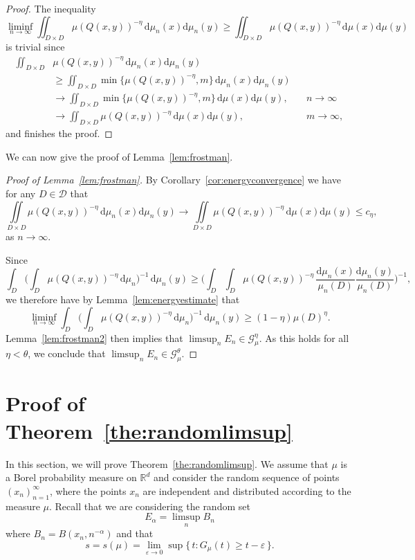 \documentclass[AHL,Unicode,longabstracts]{cedram}
\newcommand*{\dd}{\mathrm{d}}
\begin{document}
\begin{proof}
The inequality
\[
\liminf_{n\to \infty} \iint_{D \times D} \mu (Q (x,y))^{-\eta} \,
\dd \mu_n (x) \dd \mu_n (y) \geq \iint_{D \times D} \mu(Q (x,y))^{-\eta} \, \dd\mu (x) \dd \mu (y)
\]
is trivial since
\begin{align*}
\iint_{D \times D} & \mu (Q (x,y))^{-\eta} \, \dd \mu_n (x)
\dd \mu_n (y) \\ & \geq \iint_{D \times D} \min \{ \mu (Q (x,y))^{-\eta}, m \} \, \dd \mu_n (x) \dd \mu_n (y)
\\ &\to \iint_{D \times D} \min \{ \mu (Q (x,y))^{-\eta}, m \} \,
\dd \mu (x) \dd \mu (y), && n \to \infty \\ &\to
\iint_{D \times D} \mu (Q (x,y))^{-\eta} \, \dd \mu (x)
\dd \mu (y), && m \to \infty,
\end{align*}
and finishes the proof.
\end{proof}

We can now give the proof of Lemma~\ref{lem:frostman}.

\begin{proof}[Proof of Lemma~\ref{lem:frostman}]
By Corollary~\ref{cor:energyconvergence} we have for any $D \in
\mathscr{D}$ that
\[
\iint\limits_{D \times D} \mu (Q(x,y))^{-\eta} \, \dd \mu_n (x) \dd \mu_n (y) \to \iint\limits_{D \times D} \mu (Q(x,y))^{-\eta} \, \dd \mu (x) \dd \mu (y) \leq c_\eta,
\]
as $n \to \infty$.

Since
\[
\int_D \biggl(\int_D \mu (Q(x,y))^{-\eta} \, \dd \mu_n
\biggr)^{-1} \, \dd \mu_n (y) \geq \biggl(\int_D \int_D
\mu(Q(x,y))^{-\eta} \, \frac{\dd \mu_n (x)}{\mu_n (D)}
\frac{\dd \mu_n (y)}{\mu_n (D)} \biggr)^{-1},
\]
we therefore have by Lemma~\ref{lem:energyestimate} that
\[
\liminf_{n \to \infty} \int_D \biggl(\int_D \mu (Q(x,y))^{-\eta}
\, \dd \mu_n \biggr)^{-1} \, \dd \mu_n (y)
\geq (1- \eta) \mu (D)^\eta.
\]
Lemma~\ref{lem:frostman2} then implies that $\limsup_n E_n \in
\mathscr{G}_\mu^\eta$. As this holds for all $\eta < \theta$, we conclude that $\limsup_n E_n \in \mathscr{G}_\mu^\theta$.
\end{proof}


\section{Proof of Theorem~\ref{the:randomlimsup}} \label{sec:randomproof}

In this section, we will prove Theorem~\ref{the:randomlimsup}. We assume that $\mu$ is a Borel probability measure on $\mathbb{R}^d$ and consider the random sequence of points $(x_n)_{n=1}^\infty$, where the points $x_n$ are independent and distributed according to the measure $\mu$. Recall that we are considering the random set
\[
E_\alpha = \limsup_n B_n
\]
where $B_n = B(x_n,n^{-\alpha})$ and that
\[
s = s(\mu) = \lim_{\varepsilon \to 0} \sup \{\, t : G_\mu (t) \geq t - \varepsilon \,\}.
\]
\end{document}
